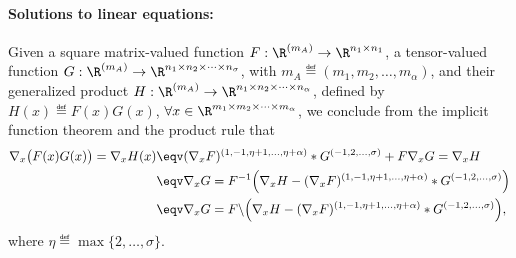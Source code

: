 \documentclass[11pt]{article}
\theoremstyle{remark}
\begin{document}
\paragraph{Solutions to linear equations:}

Given a square matrix-valued function
$F:\R^{(m_A)}\to\R^{n_1\times n_1}$, a tensor-valued function
$G:\R^{(m_A)}\to\R^{n_1\times n_2\times \cdots\times n_\sigma}$, with
$m_A\eqdef(m_1,m_2,\dots,m_\alpha)$, and their generalized product
$H:\R^{(m_A)}\to\R^{n_1\times n_2\times\cdots\times n_\alpha}$, defined by
$H(x)\eqdef F(x) G(x)$,
$\forall x\in\R^{m_1\times m_2\times\cdots\times m_\alpha}$, we conclude from the implicit function
theorem and the product rule that
\begin{align*}
  \nabla_x \big(F(x) G(x)\big)=\nabla_x H(x)
  &\eqv
  (\nabla_xF)^{(1,-1,\eta+1,\dots,\eta+\alpha)} * G^{(-1,2,\dots,\sigma)}+ F \nabla_xG=\nabla_x H\\
  &\eqv
  \nabla_xG=F^{-1}\Big(\nabla_x H-(\nabla_xF)^{(1,-1,\eta+1,\dots,\eta+\alpha)} * G^{(-1,2,\dots,\sigma)}\Big)\\
  &\eqv
  \nabla_xG=F\backslash\Big(\nabla_x H-(\nabla_xF)^{(1,-1,\eta+1,\dots,\eta+\alpha)} * G^{(-1,2,\dots,\sigma)}\Big),
\end{align*}
where $\eta\eqdef\max\{2,\dots,\sigma\}$.
\end{document}
